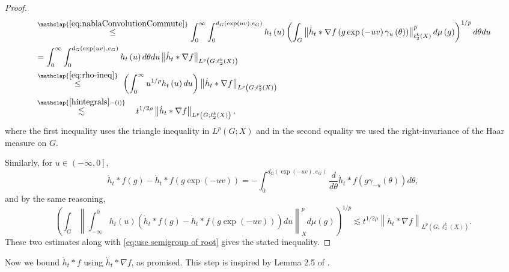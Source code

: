 \documentclass[11pt,reqno]{amsart}
\newcommand{\1}{\mathbf 1}
\begin{document}
\begin{proof}
\begin{align*}
&\stackrel{\mathclap{\eqref{eq:nablaConvolutionCommute}}}{\le}  \int_0^\infty \int_0^{d_G\left(\exp\left(uv\right),e_G\right)} h_t\left(u\right)\left(\int_{G}\left\|\dot{h}_t*\nabla f\left(g\exp\left(-uv\right)\gamma_u\left(\theta\right)\right)\right\|_{\ell_2^k\left(X\right)}^pd\mu\left(g\right)\right)^{1/p}d\theta du\\ 
&=  \int_0^\infty \int_0^{d_G\left(\exp\left(uv\right),e_G\right)} h_t\left(u\right)d\theta du \left\| \dot{h}_t*\nabla f \right\|_{L^p\left(G;\ell_2^k\left(X\right)\right)}\\ 
&\stackrel{\mathclap{\eqref{eq:rho-ineq}}}{\le}~  \left(\int_0^\infty u^{1/\rho}h_t\left(u\right)du\right)\left\|\dot{h}_t*\nabla f\right\|_{L^p\left(G;\ell_2^k\left(X\right)\right)}\\
&\stackrel{\mathclap{\eqref{hintegrals}-\mathrm{(i)}}}{\lesssim}\quad  t^{1/2\rho} \left\|\dot{h}_t*\nabla f\right\|_{L^p\left(G;\ell_2^k\left(X\right)\right)},
\end{align*}
where the first inequality uses the triangle inequality in $L^p\left(G;X\right)$ and in the second equality we used the right-invariance of the Haar measure on $G$.

Similarly, for $u\in \left(-\infty,0\right]$,
\begin{equation*}
\dot{h}_t*f\left(g\right)-\dot{h}_t*f\left(g\exp\left(-uv\right)\right)=
-\int_0^{d_G\left(\exp\left(-uv\right),e_G\right)} \frac{d}{d\theta}\dot{h}_t*f\left(g\gamma_{-u}\left(\theta\right)\right) d\theta,
\end{equation*}
and by the same reasoning,
\[
\left(\int_{G}\left\|\int_{-\infty}^0 h_t\left(u\right)\left(\dot{h}_t*f\left(g\right)-\dot{h}_t*f\left(g\exp\left(-uv\right)\right)\right)du\right\|_X^pd\mu\left(g\right)\right)^{1/p}\lesssim  t^{1/2\rho} \left\|\dot{h}_t*\nabla f\right\|_{L^p\left(G;\ell_2^k\left(X\right)\right)}.
\]
These two estimates along with \eqref{eq:use semigroup of root} gives the stated inequality.
\end{proof}

Now we bound $\dot{h}_t*f$ using $\dot{h}_t*\nabla f$, as promised. This step is inspired by Lemma 2.5 of \cite{lafforgue2014vertical}.
\end{document}
